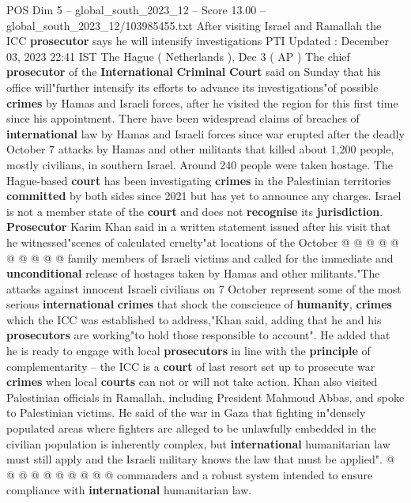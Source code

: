 \begin{textsample}{POS Dim 5 – global\_south\_2023\_12 – Score 13.00 – global\_south\_2023\_12/103985455.txt}  \label{ex:f5_pos_219}
After visiting Israel and Ramallah the ICC \textbf{prosecutor} says he will intensify investigations PTI Updated : December 03, 2023 22:41 IST The Hague ( Netherlands ), Dec 3 ( AP ) The chief \textbf{prosecutor} of the \textbf{International} \textbf{Criminal} \textbf{Court} said on Sunday that his office will"further intensify its efforts to advance its investigations"of possible \textbf{crimes} by Hamas and Israeli forces, after he visited the region for this first time since his appointment.
There have been widespread claims of breaches of \textbf{international} law by Hamas and Israeli forces since war erupted after the deadly October 7 attacks by Hamas and other militants that killed about 1,200 people, mostly civilians, in southern Israel.
Around 240 people were taken hostage.
The Hague-based \textbf{court} has been investigating \textbf{crimes} in the Palestinian territories \textbf{committed} by both sides since 2021 but has yet to announce any charges.
Israel is not a member state of the \textbf{court} and does not \textbf{recognise} its \textbf{jurisdiction}. \textbf{Prosecutor} Karim Khan said in a written statement issued after his visit that he witnessed"scenes of calculated cruelty"at locations of the October @ @ @ @ @ @ @ @ @ @ family members of Israeli victims and called for the immediate and \textbf{unconditional} release of hostages taken by Hamas and other militants."The attacks against innocent Israeli civilians on 7 October represent some of the most serious \textbf{international} \textbf{crimes} that shock the conscience of \textbf{humanity}, \textbf{crimes} which the ICC was established to address,"Khan said, adding that he and his \textbf{prosecutors} are working"to hold those responsible to account".
He added that he is ready to engage with local \textbf{prosecutors} in line with the \textbf{principle} of complementarity -- the ICC is a \textbf{court} of last resort set up to prosecute war \textbf{crimes} when local \textbf{courts} can not or will not take action.
Khan also visited Palestinian officials in Ramallah, including President Mahmoud Abbas, and spoke to Palestinian victims.
He said of the war in Gaza that fighting in"densely populated areas where fighters are alleged to be unlawfully embedded in the civilian population is inherently complex, but \textbf{international} humanitarian law must still apply and the Israeli military knows the law that must be applied". @ @ @ @ @ @ @ @ @ @ commanders and a robust system intended to ensure compliance with \textbf{international} humanitarian law.

\end{textsample}
